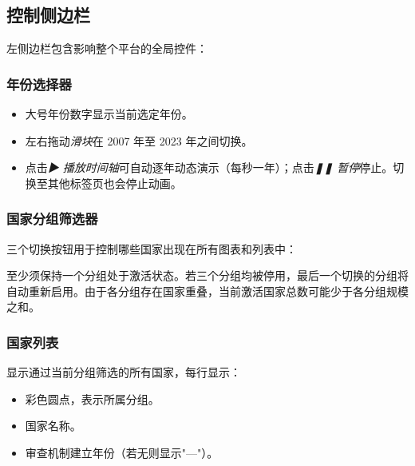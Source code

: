 \documentclass[12pt,a4paper]{article}
\newcommand{\badge}[2]{%
  \colorbox{#1}{\color{white}\footnotesize\textbf{\strut\,#2\,}}%
}
\newcommand{\uielem}[1]{\textit{#1}}
\begin{document}
\subsection{控制侧边栏}
\label{sec:rail}

左侧边栏包含影响整个平台的全局控件：

\subsubsection{年份选择器}

\begin{itemize}
  \item 大号年份数字显示当前选定年份。
  \item 左右拖动\uielem{滑块}在 2007 年至 2023 年之间切换。
  \item 点击\uielem{▶ 播放时间轴}可自动逐年动态演示（每秒一年）；点击\uielem{❚❚ 暂停}停止。切换至其他标签页也会停止动画。
\end{itemize}

\subsubsection{国家分组筛选器}

三个切换按钮用于控制哪些国家出现在所有图表和列表中：


\begin{warnbox}[注意]
至少须保持一个分组处于激活状态。若三个分组均被停用，最后一个切换的分组将自动重新启用。由于各分组存在国家重叠，当前激活国家总数可能少于各分组规模之和。
\end{warnbox}

\subsubsection{国家列表}

显示通过当前分组筛选的所有国家，每行显示：
\begin{itemize}
  \item 彩色圆点，表示所属分组。
  \item 国家名称。
  \item 审查机制建立年份（若无则显示"—"）。
\end{itemize}
\end{document}
